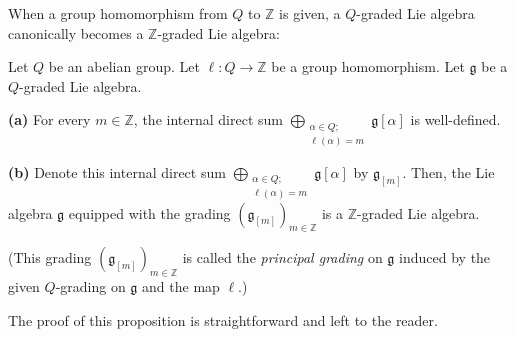 \documentclass[etingof-lie.tex]{subfiles}
\begin{document}
When a group homomorphism from $Q$ to $\mathbb{Z}$ is given, a $Q$-graded Lie
algebra canonically becomes a $\mathbb{Z}$-graded Lie algebra:

\begin{proposition}
\label{prop.Q-graded.principal}Let $Q$ be an abelian group. Let $\ell
:Q\rightarrow\mathbb{Z}$ be a group homomorphism. Let $\mathfrak{g}$ be a
$Q$-graded Lie algebra.

\textbf{(a)} For every $m\in\mathbb{Z}$, the internal direct sum
$\bigoplus\limits_{\substack{\alpha\in Q;\\\ell\left(  \alpha\right)
=m}}\mathfrak{g}\left[  \alpha\right]  $ is well-defined.

\textbf{(b)} Denote this internal direct sum $\bigoplus
\limits_{\substack{\alpha\in Q;\\\ell\left(  \alpha\right)  =m}}\mathfrak{g}%
\left[  \alpha\right]  $ by $\mathfrak{g}_{\left[  m\right]  }$. Then, the Lie
algebra $\mathfrak{g}$ equipped with the grading $\left(  \mathfrak{g}%
_{\left[  m\right]  }\right)  _{m\in\mathbb{Z}}$ is a $\mathbb{Z}$-graded Lie algebra.

(This grading $\left(  \mathfrak{g}_{\left[  m\right]  }\right)
_{m\in\mathbb{Z}}$ is called the \textit{principal grading} on $\mathfrak{g}$
induced by the given $Q$-grading on $\mathfrak{g}$ and the map $\ell$.)
\end{proposition}

\begin{vershort}
The proof of this proposition is straightforward and left to the reader.
\end{vershort}
\end{document}

